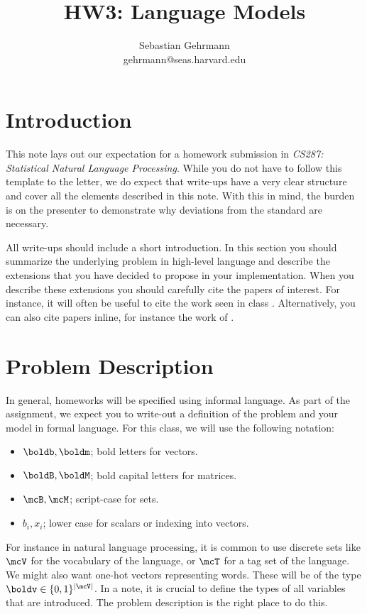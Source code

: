 \documentclass[11pt]{article}
\title{HW3: Language Models}
\author{Sebastian Gehrmann \\ gehrmann@seas.harvard.edu}
\begin{document}
\maketitle{}
\section{Introduction}

This note lays out our expectation for a homework submission in
\textit{CS287: Statistical Natural Language Processing}. While you do
not have to follow this template to the letter, we do expect that
write-ups have a very clear structure and cover all the elements
described in this note. With this in mind, the burden is on the
presenter to demonstrate why deviations from the standard are
necessary.

All write-ups should include a short introduction. In this section you
should summarize the underlying problem in high-level language and
describe the extensions that you have decided to propose in your
implementation. When you describe these extensions you should
carefully cite the papers of interest. For instance, it will often be
useful to cite the work seen in class
\citep{murphy2012machine}. Alternatively, you can also cite papers
inline, for instance the work of \citet{berger1996maximum}.


\section{Problem Description}

In general, homeworks will be specified using informal
language. As part of the assignment, we expect you to write-out a
definition of the problem and your model in formal language. For this
class, we will use the following notation:

\begin{itemize}
\item $\boldb, \boldm$;  bold letters for vectors.
\item $\boldB, \boldM$;  bold capital letters for matrices.
\item $\mcB, \mcM$;  script-case for sets.
\item $b_i, x_i$; lower case for scalars or indexing into vectors.
\end{itemize}


For instance in natural language processing, it is common to use
discrete sets like $\mcV$ for the vocabulary of the language, or $\mcT$ for a
tag set of the language.  We might also want one-hot vectors
representing words. These will be of the type
$\boldv \in \{0,1\}^{|\mcV|}$. In a note, it is crucial to define the
types of all variables that are introduced. The problem description is the
right place to do this.
\end{document}

